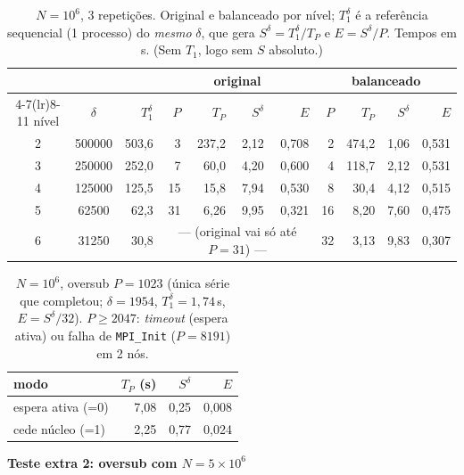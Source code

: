 \documentclass[10pt]{article}
\newcommand{\sd}{\ensuremath{S^{\delta}}}
\begin{document}
\begin{table}[htbp]\centering\footnotesize
\caption{$N{=}10^6$, 3 repetições. Original e balanceado por nível; $T_1^{\delta}$ é a referência
sequencial (1 processo) do \emph{mesmo} $\delta$, que gera $\sd{=}T_1^{\delta}/T_P$ e $E{=}\sd/P$. Tempos
em s. (Sem $T_1$, logo sem $S$ absoluto.)}
\label{tab:1m}
\begin{tabular}{c c r @{\hskip 1.2em} r r r r @{\hskip 1.8em} r r r r}
\toprule
 & & & \multicolumn{4}{c}{\textbf{original}} & \multicolumn{4}{c}{\textbf{balanceado}}\\
\cmidrule(lr){4-7}\cmidrule(lr){8-11}
nível & $\delta$ & $T_1^{\delta}$ & $P$ & $T_P$ & \sd & $E$ & $P$ & $T_P$ & \sd & $E$\\
\midrule
2 & 500000 & 503,6 &  3 & 237,2 & 2,12 & 0,708 &  2 & 474,2 & 1,06 & 0,531\\
3 & 250000 & 252,0 &  7 &  60,0 & 4,20 & 0,600 &  4 & 118,7 & 2,12 & 0,531\\
4 & 125000 & 125,5 & 15 &  15,8 & 7,94 & 0,530 &  8 &  30,4 & 4,12 & 0,515\\
5 &  62500 &  62,3 & 31 &   6,26 & 9,95 & 0,321 & 16 &   8,20 & 7,60 & 0,475\\
6 &  31250 &  30,8 & \multicolumn{4}{c}{--- (original vai só até $P{=}31$) ---} & 32 & 3,13 & 9,83 & 0,307\\
\bottomrule
\end{tabular}
\end{table}

\begin{table}[htbp]\centering\footnotesize
\caption{$N{=}10^6$, oversub $P{=}1023$ (única série que completou; $\delta{=}1954$,
$T_1^{\delta}{=}1{,}74$\,s, $E{=}\sd/32$). $P\ge2047$: \emph{timeout} (espera ativa) ou falha de
\texttt{MPI\_Init} ($P{=}8191$) em 2 nós.}
\label{tab:over1m}
\begin{tabular}{l r r r}
\toprule
modo & $T_P$ (s) & \sd & $E$\\
\midrule
espera ativa (=0) & 7,08 & 0,25 & 0,008\\
cede núcleo (=1)  & 2,25 & 0,77 & 0,024\\
\bottomrule
\end{tabular}
\end{table}

\vspace{4pt}
\textbf{\large Teste extra 2: oversub com $N = 5\times10^6$}
\end{document}
